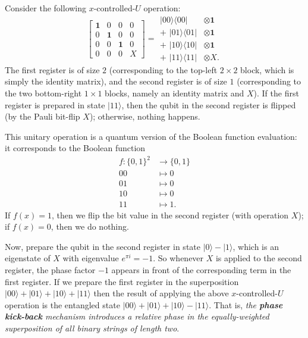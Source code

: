 \documentclass[fleqn,a4paper]{article}
\theoremstyle{definition}
\theoremstyle{definition}
\theoremstyle{definition}
\theoremstyle{definition}
\theoremstyle{remark}
\begin{document}
Consider the following \(x\)-controlled-\(U\) operation:
\[
  \left[
    \begin{array}{cccc}
      \mathbf{1}& 0 & 0 & 0
    \\0 & \mathbf{1}& 0 & 0
    \\0 & 0 & \mathbf{1}& 0
    \\0 & 0 & 0 & X
    \end{array}
  \right]
  = \begin{aligned}
    |00\rangle\langle 00|&\otimes\mathbf{1}
  \\+\,\,|01\rangle\langle 01|&\otimes\mathbf{1}
  \\+\,\,|10\rangle\langle 10|&\otimes\mathbf{1}
  \\+\,\,|11\rangle\langle 11|&\otimes X.
  \end{aligned}
\]
The first register is of size \(2\) (corresponding to the top-left \(2\times 2\) block, which is simply the identity matrix), and the second register is of size \(1\) (corresponding to the two bottom-right \(1\times1\) blocks, namely an identity matrix and \(X\)).
If the first register is prepared in state \(|11\rangle\), then the qubit in the second register is flipped (by the Pauli bit-flip \(X\)); otherwise, nothing happens.

This unitary operation is a quantum version of the Boolean function evaluation: it corresponds to the Boolean function
\[
  \begin{aligned}
    f\colon\{0,1\}^2 &\longrightarrow \{0,1\}
  \\00&\longmapsto0
  \\01&\longmapsto0
  \\10&\longmapsto0
  \\11&\longmapsto1.
  \end{aligned}
\]
If \(f(x)=1\), then we flip the bit value in the second register (with operation \(X\)); if \(f(x)=0\), then we do nothing.

Now, prepare the qubit in the second register in state \(|0\rangle-|1\rangle\), which is an eigenstate of \(X\) with eigenvalue \(e^{\pi i}=-1\).
So whenever \(X\) is applied to the second register, the phase factor \(-1\) appears in front of the corresponding term in the first register.
If we prepare the first register in the superposition \(|00\rangle+|01\rangle+|10\rangle+|11\rangle\) then the result of applying the above \(x\)-controlled-\(U\) operation is the entangled state \(|00\rangle+|01\rangle+|10\rangle-|11\rangle\).
That is, \emph{the \textbf{phase kick-back} mechanism introduces a relative phase in the equally-weighted superposition of all binary strings of length two}.
\end{document}
